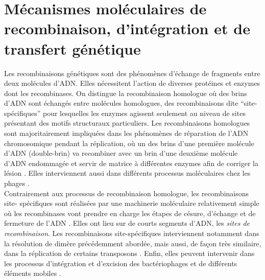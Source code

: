 \section{Mécanismes moléculaires de recombinaison, d'intégration et de transfert génétique}\label{recom}
	Les recombinaisons génétiques sont des phénomènes d'échange de fragments entre deux molécules d'ADN. Elles nécessitent l'action de diverses protéines et enzymes dont les recombinases. On distingue la recombinaison homologue où des brins d'ADN sont échangés entre molécules homologues, des recombinaisons dite “site-spécifiques” pour lesquelles les enzymes agissent seulement au niveau de sites présentant des motifs structuraux particuliers. Les recombinaisons homologues sont majoritairement impliquées dans les phénomènes de réparation de l'ADN chromosomique pendant la réplication, où un des brins d'une première molécule d'ADN (double-brin) va recombiner avec un brin d'une deuxième molécule d'ADN endommagée et servir de matrice à différentes enzymes afin de corriger la lésion \citep{perry1997microbiology, Barre2005}. Elles interviennent aussi dans différents processus moléculaires chez les phages \citep{Lopes2010}.\\
	Contrairement aux processus de recombinaison homologue, les recombinaisons site- spécifiques sont réalisées par une machinerie moléculaire relativement simple où les recombinases vont prendre en charge les étapes de césure, d'échange et de fermeture de l'ADN \citep{hallet2004dna}. Elles ont lieu sur de courts segments d'ADN, les \textit{sites de recombinaison}. Les recombinaisons site-spécifiques interviennent notamment dans la résolution de dimère précédemment abordée, mais aussi, de façon très similaire, dans la réplication de certains transposons \citep{hallet2004dna}. Enfin, elles peuvent intervenir dans les processus d'intégration et d'excision des bactériophages et de différents éléments mobiles \citep{hallet2004dna}. 
 
